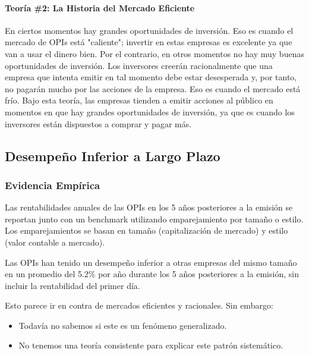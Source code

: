 \paragraph{Teoría \#2: La Historia del Mercado Eficiente}

\begin{teorema}
En ciertos momentos hay grandes oportunidades de inversión. Eso es cuando el mercado de OPIs está "caliente"; invertir en estas empresas es excelente ya que van a usar el dinero bien. Por el contrario, en otros momentos no hay muy buenas oportunidades de inversión. Los inversores creerán racionalmente que una empresa que intenta emitir en tal momento debe estar desesperada y, por tanto, no pagarán mucho por las acciones de la empresa. Eso es cuando el mercado está frío. Bajo esta teoría, las empresas tienden a emitir acciones al público en momentos en que hay grandes oportunidades de inversión, ya que es cuando los inversores están dispuestos a comprar y pagar más.
\end{teorema}

\subsection{Desempeño Inferior a Largo Plazo}

\subsubsection{Evidencia Empírica}

Las rentabilidades anuales de las OPIs en los 5 años posteriores a la emisión se reportan junto con un benchmark utilizando emparejamiento por tamaño o estilo. Los emparejamientos se basan en tamaño (capitalización de mercado) y estilo (valor contable a mercado).

\begin{proposicion}
Las OPIs han tenido un desempeño inferior a otras empresas del mismo tamaño en un promedio del 5.2\% por año durante los 5 años posteriores a la emisión, sin incluir la rentabilidad del primer día.
\end{proposicion}

Esto parece ir en contra de mercados eficientes y racionales. Sin embargo:
\begin{itemize}
\item Todavía no sabemos si este es un fenómeno generalizado.
\item No tenemos una teoría consistente para explicar este patrón sistemático.
\end{itemize}


